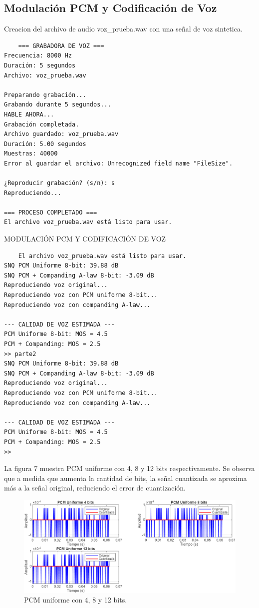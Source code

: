 \documentclass[journal]{IEEEtran} %
\begin{document}
\subsection{Modulación PCM y Codificación de Voz}
Creacion del archivo de audio voz\_prueba.wav con una señal de voz sintetica.
\begin{verbatim}
    === GRABADORA DE VOZ ===
Frecuencia: 8000 Hz
Duración: 5 segundos
Archivo: voz_prueba.wav

Preparando grabación...
Grabando durante 5 segundos...
HABLE AHORA...
Grabación completada.
Archivo guardado: voz_prueba.wav
Duración: 5.00 segundos
Muestras: 40000
Error al guardar el archivo: Unrecognized field name "FileSize".

¿Reproducir grabación? (s/n): s
Reproduciendo...

=== PROCESO COMPLETADO ===
El archivo voz_prueba.wav está listo para usar.

\end{verbatim}

MODULACIÓN PCM Y CODIFICACIÓN DE VOZ
\begin{verbatim}
    El archivo voz_prueba.wav está listo para usar.
SNQ PCM Uniforme 8-bit: 39.88 dB
SNQ PCM + Companding A-law 8-bit: -3.09 dB
Reproduciendo voz original...
Reproduciendo voz con PCM uniforme 8-bit...
Reproduciendo voz con companding A-law...

--- CALIDAD DE VOZ ESTIMADA ---
PCM Uniforme 8-bit: MOS = 4.5
PCM + Companding: MOS = 2.5
>> parte2
SNQ PCM Uniforme 8-bit: 39.88 dB
SNQ PCM + Companding A-law 8-bit: -3.09 dB
Reproduciendo voz original...
Reproduciendo voz con PCM uniforme 8-bit...
Reproduciendo voz con companding A-law...

--- CALIDAD DE VOZ ESTIMADA ---
PCM Uniforme 8-bit: MOS = 4.5
PCM + Companding: MOS = 2.5
>> 

\end{verbatim}

La figura 7 muestra PCM uniforme con 4, 8 y 12 bits respectivamente. Se observa que a medida que aumenta la cantidad de bits, la señal cuantizada se aproxima más a la señal original, reduciendo el error de cuantización.
\begin{figure}[htbp]
    \centerline{\includegraphics[width=0.8\columnwidth]{Figure_7.png}}
    \caption{PCM uniforme con 4, 8 y 12 bits.}
    \label{fig} 
\end{figure}
\end{document}
